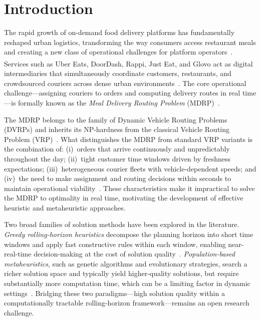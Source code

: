 
\section{Introduction}\label{sec:intro}

The rapid growth of on-demand food delivery platforms has fundamentally
reshaped urban logistics, transforming the way consumers access restaurant
meals and creating a new class of operational challenges for platform
operators~\cite{savelsbergh2022challenges}.
Services such as Uber Eats\textsuperscript{\textregistered},
DoorDash\textsuperscript{\textregistered},
Rappi\textsuperscript{\textregistered},
Just Eat\textsuperscript{\textregistered}, and
Glovo\textsuperscript{\textregistered}
act as digital intermediaries that simultaneously coordinate
customers, restaurants, and crowdsourced couriers across dense
urban environments~\cite{reyes2018mdrp}.
The core operational challenge—assigning couriers to orders and
computing delivery routes in real time—is formally known as the
\emph{Meal Delivery Routing Problem} (MDRP)~\cite{reyes2018mdrp}.

The MDRP belongs to the family of Dynamic Vehicle Routing Problems
(DVRPs) and inherits its NP-hardness from the classical
Vehicle Routing Problem (VRP)~\cite{wen2010dynamic}.
What distinguishes the MDRP from standard VRP variants is the
combination of: (i)~orders that arrive continuously and unpredictably
throughout the day; (ii)~tight customer time windows driven by
freshness expectations; (iii)~heterogeneous courier fleets
with vehicle-dependent speeds; and (iv)~the need to make
assignment and routing decisions within seconds to maintain
operational viability~\cite{ulmer2021restaurant,reyes2018mdrp}.
These characteristics make it impractical to solve the MDRP to
optimality in real time, motivating the development of effective
heuristic and metaheuristic approaches.

Two broad families of solution methods have been explored in
the literature.
\emph{Greedy rolling-horizon heuristics} decompose the planning
horizon into short time windows and apply fast constructive
rules within each window, enabling near-real-time
decision-making at the cost of solution quality~\cite{auad2023courier}.
\emph{Population-based metaheuristics}, such as genetic algorithms
and evolutionary strategies, search a richer solution space and
typically yield higher-quality solutions, but require substantially
more computation time, which can be a limiting factor in dynamic
settings~\cite{liao2020multiobjective}.
Bridging these two paradigms—high solution quality within a
computationally tractable rolling-horizon framework—remains
an open research challenge.


